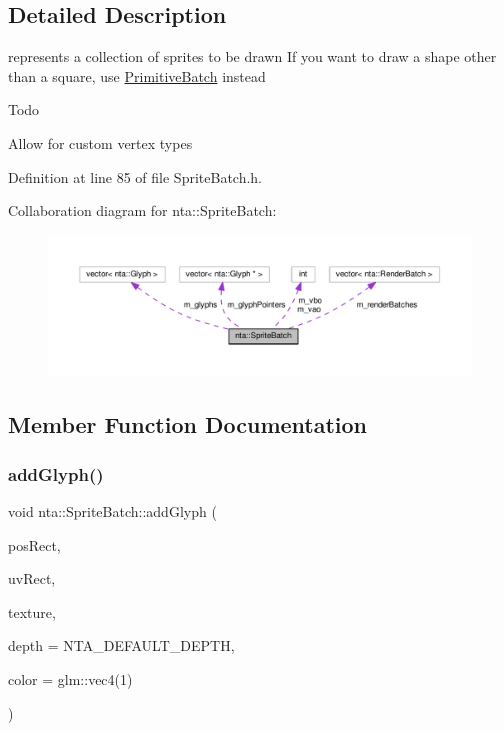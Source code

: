 \subsection{Detailed Description}
represents a collection of sprites to be drawn If you want to draw a shape other than a square, use \hyperlink{classnta_1_1PrimitiveBatch}{Primitive\+Batch} instead \begin{DoxyRefDesc}{Todo}
\item[\hyperlink{todo__todo000012}{Todo}]Allow for custom vertex types \end{DoxyRefDesc}


Definition at line 85 of file Sprite\+Batch.\+h.



Collaboration diagram for nta\+:\+:Sprite\+Batch\+:\nopagebreak
\begin{figure}[H]
\begin{center}
\leavevmode
\includegraphics[width=350pt]{da/dc5/classnta_1_1SpriteBatch__coll__graph}
\end{center}
\end{figure}


\subsection{Member Function Documentation}
\mbox{\label{classnta_1_1SpriteBatch_aa703fb92d0bd42865c21fdfb2625660d}} 
\subsubsection{\texorpdfstring{add\+Glyph()}{addGlyph()}}
{\footnotesize\ttfamily void nta\+::\+Sprite\+Batch\+::add\+Glyph (\begin{DoxyParamCaption}\item[{crvec4}]{pos\+Rect,  }\item[{crvec4}]{uv\+Rect,  }\item[{G\+Luint}]{texture,  }\item[{float}]{depth = {\ttfamily NTA\+\_\+DEFAULT\+\_\+DEPTH},  }\item[{crvec4}]{color = {\ttfamily glm\+:\+:vec4(1)} }\end{DoxyParamCaption})}

